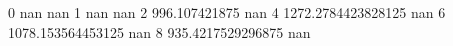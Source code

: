 0 nan nan
1 nan nan
2 996.107421875 nan
4 1272.2784423828125 nan
6 1078.153564453125 nan
8 935.4217529296875 nan
